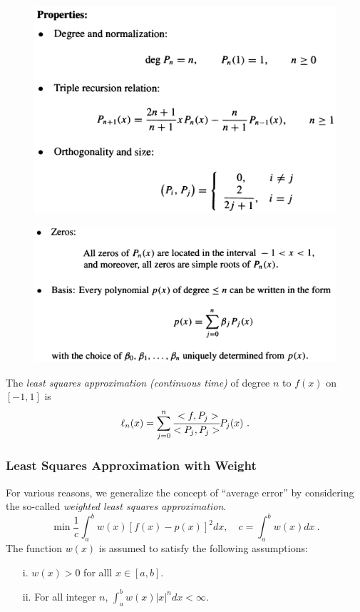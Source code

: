 \documentclass[12pt]{article}
\theoremstyle{theorem}
\begin{document}
\begin{figure}[h!]
	\centering
	\includegraphics[scale = 0.8]{Figures/39}
	\label{fig:39}
\end{figure}

\begin{figure}[h!]
	\centering
	\includegraphics[scale = 0.8]{Figures/40}
	\label{fig:40}
\end{figure}

\begin{shaded}
The \emph{least squares approximation (continuous time)} of degree $n$ to $f(x)$ on $[-1,1]$ is
%
\begin{equation}\label{1}
 \ell_n(x) = \sum_{j=0}^{n} \cfrac{<f,P_j>}{<P_j,P_j>} P_j(x) \ .
\end{equation}  
%
\end{shaded}

\subsubsection{Least Squares Approximation with Weight}

For various reasons, we generalize the concept of “average error” by considering the so-called \emph{weighted least squares approximation}. 
%
\begin{equation*}
 \min\frac{1}{c} \int_{a}^{b} w(x) [f(x)-p(x)]^2 dx, \quad c=\int_{a}^{b} w(x)dx \ .
\end{equation*}
%
The function $w(x)$ is assumed to satisfy the following assumptions: 
\begin{enumerate}
\item[i.] $w(x)>0$ for alll $x\in  [a,b]$.
\item[ii.] For all integer $n$, $\int_{a}^{b} w(x) |x|^n dx < \infty$.
\end{enumerate}
\end{document}
